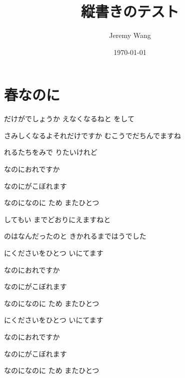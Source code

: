 \documentclass{jlreq}
\title{縦書きのテスト}
\author{Jeremy Wang}
\date{\today}
\begin{document}
\maketitle

\section{春なのに}

だけが\quad{}でしょうか\quad
{}えなくなるねと をして


さみしくなるよ\quad それだけですか\quad
むこうでだち\quad {}んでますね

れるたちを\quad{}みで\quad
{}りたいけれど
\vspace{1em}

なのに\quad おれですか

なのに\quad {}がこぼれます

なのに\quad {}なのに\quad
ため またひとつ
\vspace{1em}

しても\quad {}い\quad
{}までどおりに\quad {}えますねと

のは\quad なんだったのと\quad
きかれるまでは\quad {}うでした

にください\quad {}をひとつ\quad
{}いに\quad {}てます
\vspace{1em}

なのに\quad おれですか

なのに\quad {}がこぼれます

なのに\quad {}なのに\quad
ため またひとつ
\vspace{1em}

にください\quad {}をひとつ\quad
{}いに\quad {}てます
\vspace{1em}

なのに\quad おれですか\quad

なのに\quad {}がこぼれます

なのに\quad {}なのに\quad
ため またひとつ
\end{document}
